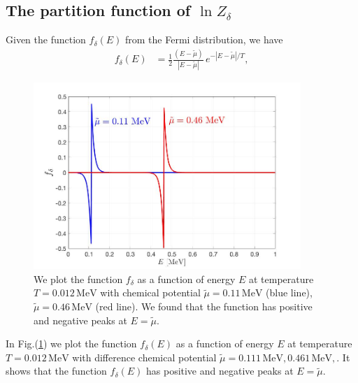 \documentclass[sn-mathphys,Numbered]{sn-jnl}
\theoremstyle{thmstyleone}%
\theoremstyle{thmstyletwo}%
\theoremstyle{thmstylethree}%
\begin{document}
\subsection{The partition function of $\ln{Z}_\delta$}
Given the function $f_\delta(E)$ from the Fermi distribution, we have
\begin{align}
f_{\delta}(E)&=\frac{1}{2}\frac{(E-\tilde\mu)}{|E-\tilde\mu|}\,e^{-|E-\tilde\mu|/T},
\end{align}
\begin{figure}[ht]
\begin{center}
\includegraphics[width=0.9\textwidth]{./plot/f_delta}
\caption{We plot the function $f_\delta$ as a function of energy $E$ at temperature $T=0.012\,\mathrm{MeV}$ with chemical potential $\tilde\mu=0.11\,\mathrm{MeV}$ (blue line), 
 $\tilde\mu=0.46\,\mathrm{MeV}$ (red line). We found that the function has positive and negative peaks at  $E=\tilde\mu$. }
\label{f_delta_graph}
\end{center}
\end{figure}
In Fig.(\ref{f_delta_graph}) we plot the function $f_{\delta}(E)$ as a function of energy $E$ at temperature $T=0.012\,\mathrm{MeV}$ with difference chemical potential $\tilde\mu=0.111\,\mathrm{MeV},0.461\,\mathrm{MeV},$. It shows that the function $f_\delta(E)$ has positive and negative peaks at $E=\tilde\mu$.  
\end{document}
